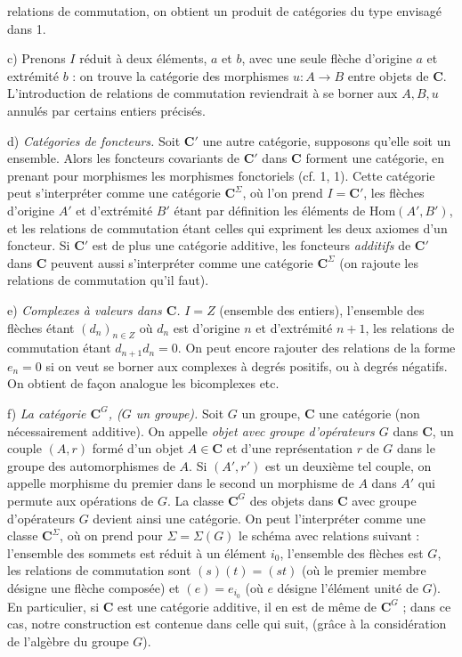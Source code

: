 
\noindent relations de commutation, on obtient un produit de catégories du
type envisagé dans 1.

c) Prenons $I$ réduit à deux éléments, $a$ et $b$, avec une seule
flèche d'origine $a$ et extrémité $b$ : on trouve la catégorie des morphismes
$u:A\to B$ entre objets de $\mathbf{C}$. L'introduction de relations de
commutation reviendrait à se borner aux $A,B,u$ annulés par certains entiers
précisés.

d) \textit{Catégories de foncteurs.} Soit $\mathbf{C}'$ une autre catégorie,
supposons qu'elle soit un ensemble. Alors les foncteurs covariants de $\mathbf{C}'$ dans
$\mathbf{C}$ forment une catégorie, en prenant pour morphismes les morphismes
fonctoriels (cf. 1, 1). Cette catégorie peut s'interpréter comme une catégorie
$\mathbf{C}^\Sigma$, où l'on prend $I=\mathbf{C}'$, les flèches d'origine $A'$ et d'extrémité
$B'$ étant par définition les éléments de $\mathrm{Hom}(A',B')$, et les
relations de commutation étant celles qui expriment les deux axiomes d'un
foncteur. Si $\mathbf{C}'$ est de plus une catégorie additive, les foncteurs
\textit{additifs} de $\mathbf{C}'$ dans $\mathbf{C}$ peuvent aussi s'interpréter comme une
catégorie $\mathbf{C}^\Sigma$ (on rajoute les relations de commutation qu'il faut).

e) \textit{Complexes à valeurs dans $\mathbf{C}$.} $I=Z$ (ensemble
des entiers), l'ensemble des flèches étant $(d_n)_{n\in Z}$ où $d_n$
est d'origine $n$ et d'extrémité $n+1$, les relations de commutation étant
$d_{n+1}d_n=0$. On peut encore rajouter des relations de la forme $e_n=0$ si
on veut se borner aux complexes à degrés positifs, ou à degrés négatifs. On
obtient de façon analogue les bicomplexes etc.

f) \textit{La catégorie $\mathbf{C}^G$, ($G$ un groupe).} Soit $G$ un groupe,
$\mathbf{C}$ une catégorie (non nécessairement additive). On appelle \textit{objet avec
groupe d'opérateurs $G$} dans $\mathbf{C}$, un couple $(A,r)$ formé d'un objet $A\in \mathbf{C}$
et d'une représentation $r$ de $G$ dans le groupe des automorphismes de $A$.
Si $(A',r')$ est un deuxième tel couple, on appelle morphisme du premier dans
le second un morphisme de $A$ dans $A'$ qui permute aux opérations de $G$. La
classe $\mathbf{C}^G$ des objets dans $\mathbf{C}$ avec groupe d'opérateurs $G$ devient ainsi une
catégorie. On peut l'interpréter comme une classe $\mathbf{C}^\Sigma$, où on prend pour
$\Sigma=\Sigma(G)$ le schéma avec relations suivant : l'ensemble des sommets
est réduit à un élément $i_0$, l'ensemble des flèches est $G$, les relations de
commutation sont $(s)(t)=(st)$ (où le premier membre désigne une flèche
composée) et $(e)=e_{i_0}$ (où $e$ désigne l'élément unité de $G$). En
particulier, si $\mathbf{C}$ est une catégorie additive, il en est de même de $\mathbf{C}^G$ ;
dans ce cas, notre construction est contenue dans celle qui suit, (grâce à la
considération de l'algèbre du groupe $G$).

